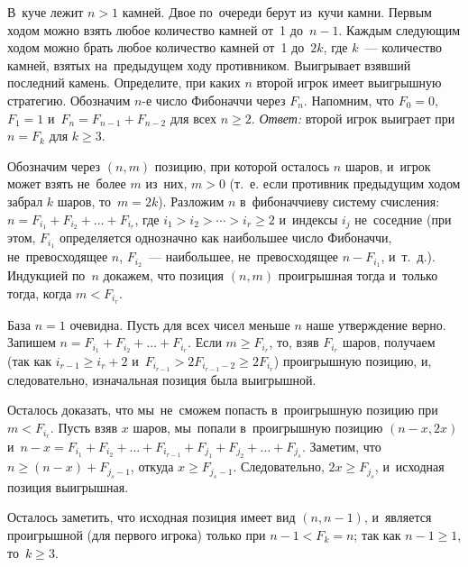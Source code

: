 \problem{}
В~куче лежит $n > 1$ камней.
Двое по~очереди берут из~кучи камни.
Первым ходом можно взять любое количество камней от~1 до~$n-1$.
Каждым следующим ходом можно брать любое количество камней от~1 до~$2 k$, где
$k$~--- количество камней, взятых на~предыдущем ходу противником.
Выигрывает взявший последний камень.
Определите, при каких $n$ второй игрок имеет выигрышную стратегию.
\solution
Обозначим $n$-е число Фибоначчи через $F_n$.
Напомним, что $F_0 = 0$, $F_1 = 1$ и~$F_n = F_{n-1} + F_{n-2}$ для всех
$n \geq 2$.
\emph{Ответ:} второй игрок выиграет при $n = F_k$ для $k \geq 3$.
\par
Обозначим через $(n, m)$ позицию, при которой осталось $n$ шаров, и~игрок может
взять не~более $m$ из~них, $m > 0$
(т.~е. если противник предыдущим ходом забрал $k$ шаров, то~$m = 2 k$).
Разложим $n$ в~фибоначчиеву систему счисления:
$n = F_{i_1} + F_{i_2} + \ldots + F_{i_r}$,
где $i_1 > i_2 > \cdots > i_r \geq 2$ и~индексы $i_j$ не~соседние
(при этом, $F_{i_1}$ определяется однозначно как наибольшее число Фибоначчи,
не~превосходящее $n$, $F_{i_2}$~--- наибольшее, не~превосходящее $n - F_{i_1}$,
и~т.~д.).
Индукцией по~$n$ докажем, что позиция $(n, m)$ проигрышная тогда и~только
тогда, когда $m < F_{i_r}$.
\par
База $n = 1$ очевидна.
Пусть для всех чисел меньше $n$ наше утверждение верно.
Запишем $n = F_{i_1} + F_{i_2} + \ldots + F_{i_r}$.
Если $m \geq F_{i_r}$, то, взяв $F_{i_r}$ шаров, получаем
(так как $i_{r-1} \geq i_r + 2$
и~$F_{i_{r-1}} > 2 F_{i_{r-1}-2} \geq 2 F_{i_r}$)
проигрышную позицию, и, следовательно, изначальная позиция была выигрышной.
\par
Осталось доказать, что мы~не~сможем попасть в~проигрышную позицию при
$m < F_{i_r}$.
Пусть взяв $x$ шаров, мы~попали в~проигрышную позицию $(n-x, 2 x)$
и~\(
    n - x
=
    F_{i_1} + F_{i_2} + \ldots + F_{i_{r-1}} +
    F_{j_1} + F_{j_2} + \ldots + F_{j_s}
\).
Заметим, что $n \geq (n - x) + F_{j_s-1}$, откуда $x \geq F_{j_s-1}$.
Следовательно, $2 x \geq F_{j_s}$, и~исходная позиция выигрышная.
\par
Осталось заметить, что исходная позиция имеет вид $(n, n-1)$, и~является
проигрышной (для первого игрока) только при $n - 1 < F_k = n$;
так как $n - 1 \geq 1$, то~$k \geq 3$.
\endproblem
